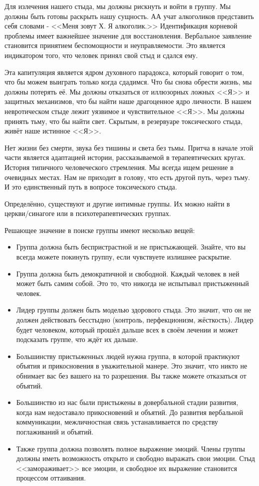 \documentclass[10pt, fleqn]{article}
\begin{document}
Для излечения нашего стыда, мы должны рискнуть и войти в группу. Мы должны быть готовы раскрыть нашу сущность. АА учат алкоголиков представить себя словами - <<Меня зовут Х. Я алкоголик.>> Идентификация корневой проблемы имеет важнейшее значение для восстановления. Вербальное заявление становится принятием беспомощности и неуправляемости. Это является индикатором того, что человек принял свой стыд и сдался ему.

Эта капитуляция является ядром духовного парадокса, который говорит о том, что бы можем выиграть только когда сдадимся. Что бы снова обрести жизнь, мы должны потерять её. Мы должны отказаться от иллюзорных ложных <<Я>> и защитных механизмов, что бы найти наше драгоценное ядро личности. В нашем невротическом стыде лежит уязвимое и чувствительное <<Я>>. Мы должны принять тьму, что бы найти свет. Скрытым, в резервуаре токсического стыда, живёт наше истинное <<Я>>.

Нет жизни без смерти, звука без тишины и света без тьмы. Притча в начале этой части является адаптацией истории, рассказываемой в терапевтических кругах. История типичного человеческого стремления. Мы всегда ищем решение в очевидных местах. Нам не приходит в голову, что есть другой путь, через тьму. И это единственный путь в вопросе токсического стыда.


Определённо, существуют и другие интимные группы. Их можно найти в церкви/синагоге или в психотерапевтических группах.

Решающее значение в поиске группы имеют несколько вещей:

\begin{itemize}
\item Группа должна быть беспристрастной и не пристыжающей. Знайте, что вы всегда можете покинуть группу, если чувствуете излишнее раскрытие.
\item Группа должна быть демократичной и свободной. Каждый человек в ней может быть самим собой. Это то, что никогда не испытывал пристыженный человек.
\item Лидер группы должен быть моделью здорового стыда. Это значит, что он не должен действовать бесстыдно (контроль, перфекционизм, жёсткость). Лидер будет человеком, который прошёл дальше всех в своём лечении и может подсказать группе, что ждёт их дальше.
\item Большинству пристыженных людей нужна группа, в которой практикуют объятия и прикосновения в уважительной манере. Это значит, что никто не обнимает вас без вашего на то разрешения. Вы также можете отказаться от объятий.
\item Большинство из нас были пристыжены в довербальной стадии развития, когда нам недоставало прикосновений и объятий. До развития вербальной коммуникации, межличностная связь устанавливается по средству поглаживаний и объятий.
\item Также группа должна позволять полное выражение эмоций. Члены группы должны иметь возможность открыто и свободно выражать свои эмоции. Стыд <<замораживает>> все эмоции, и свободное их выражение становится процессом оттаивания.
\end{itemize}
\end{document}

